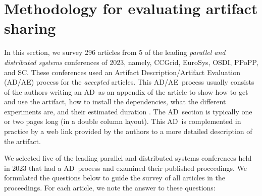 \documentclass[sigconf,natbib=false]{acmart}
\newcommand{\ad}{AD}
\newcommand{\aeval}{AE}
\newcommand{\adae}{\ad/\aeval}
\newcommand{\todo}[1]{{\color{red}{TODO: #1}}}
\newcommand{\fmc}[1]{{\color{magenta} #1}} %
\begin{document}
%
\section{Methodology for evaluating artifact sharing}\label{sec:methodo} %




In this section, we survey 296 articles from 5 of the leading \emph{parallel and distributed systems} conferences of 2023, namely, CCGrid, EuroSys, OSDI, PPoPP, and SC.
These conferences used an Artifact Description/Artifact Evaluation (\adae) process for the \emph{accepted} articles.
This \adae\ process usually consists of the authors writing an \ad\ as an appendix of the article to show how to get and use the artifact, how to install the dependencies, what the different experiments are, and their estimated duration \cite{ae_tip, creating_successful_artifacts, ae_guidelines}.
The \ad\ section is typically one or two pages long (in a double column layout).
This \ad\ is complemented in practice by a web link provided by the authors to a more detailed description of the artifact.




We selected five of the leading parallel and distributed systems conferences held in 2023 that had a \ad\ process and examined their published proceedings.
We formulated the questions below to guide the survey of all articles in the proceedings.
For each article, we note the answer to these questions: 
\end{document}
